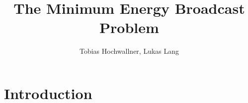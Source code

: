 \documentclass{article}
\theoremstyle{definition}
\begin{document}
\date{}
\author{Tobias Hochwallner, Lukas Lang}
\title{The Minimum Energy Broadcast Problem}
\maketitle

\section{Introduction}
\end{document}
